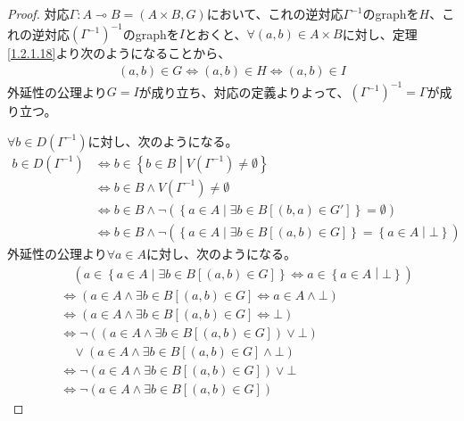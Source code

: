 \documentclass[a4paper]{jsarticle}
\begin{document}
\begin{proof}
対応$\varGamma:A \multimap B = (A \times B,G)$において、これの逆対応$\varGamma^{-1} $のgraphを$H$、これの逆対応$\left( \varGamma^{-1} \right)^{-1} $のgraphを$I$とおくと、$\forall (a,b) \in A\times B$に対し、定理\ref{1.2.1.18}より次のようになることから、
\begin{align*}
(a,b)\in G \Leftrightarrow (a,b) \in H \Leftrightarrow (a,b) \in I
\end{align*}
外延性の公理より$G=I$が成り立ち、対応の定義よりよって、$\left( \varGamma^{- 1} \right)^{- 1} = \varGamma$が成り立つ。\par
$\forall b \in D\left( \varGamma^{- 1} \right)$に対し、次のようになる。
\begin{align*}
b \in D\left( \varGamma^{- 1} \right) &\Leftrightarrow b \in \left\{ b \in B \middle| V\left( \varGamma^{- 1} \right) \neq \emptyset \right\}\\
&\Leftrightarrow b \in B \land V\left( \varGamma^{- 1} \right) \neq \emptyset\\
&\Leftrightarrow b \in B \land \neg\left( \left\{ a \in A \middle| \exists b \in B\left[ (b,a) \in G' \right] \right\} = \emptyset \right)\\
&\Leftrightarrow b \in B \land \neg\left( \left\{ a \in A \middle| \exists b \in B\left[ (a,b) \in G \right] \right\} = \left\{ a \in A \middle| \bot \right\} \right)
\end{align*}
外延性の公理より$\forall a \in A$に対し、次のようになる。
\begin{align*}
&\quad \left( a \in \left\{ a \in A \middle| \exists b \in B\left[ (a,b) \in G \right] \right\} \Leftrightarrow a \in \left\{ a \in A \middle| \bot \right\} \right)\\
&\Leftrightarrow \left( a \in A \land \exists b \in B\left[ (a,b) \in G \right] \Leftrightarrow a \in A \land \bot \right)\\
&\Leftrightarrow \left( a \in A \land \exists b \in B\left[ (a,b) \in G \right] \Leftrightarrow \bot \right)\\
&\Leftrightarrow \neg\left( \left( a \in A \land \exists b \in B\left[ (a,b) \in G \right] \right) \vee \bot \right) \\
&\quad \vee \left( a \in A \land \exists b \in B\left[ (a,b) \in G \right] \land \bot \right)\\
&\Leftrightarrow \neg\left( a \in A \land \exists b \in B\left[ (a,b) \in G \right] \right) \vee \bot\\
&\Leftrightarrow \neg\left( a \in A \land \exists b \in B\left[ (a,b) \in G \right] \right)

\end{align*}
\end{proof}
\end{document}
